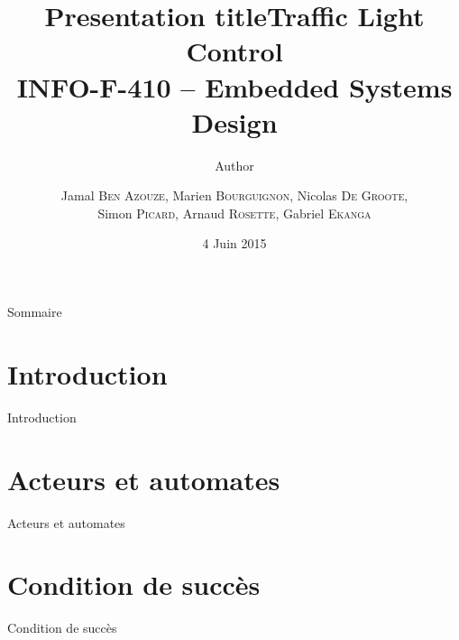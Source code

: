 \documentclass{beamer} %
\author{Author}
\title{Presentation title}
\begin{document}
\title[INFO-F-410 - Traffic Light Control]{\textbf{Traffic Light Control} \\INFO-F-410 -- Embedded Systems Design} %

\author{Jamal \textsc{Ben Azouze}, Marien \textsc{Bourguignon}, Nicolas \textsc{De Groote}, \\Simon \textsc{Picard}, Arnaud \textsc{Rosette}, Gabriel \textsc{Ekanga}}
\date{4 Juin 2015} %

\begin{frame}
\titlepage %
\end{frame}

\begin{frame}{Sommaire}
\tableofcontents %
\end{frame}

\section{Introduction}
\begin{frame}{Introduction}

\end{frame}

\section{Acteurs et automates}
\begin{frame}{Acteurs et automates}

\end{frame}

\section{Condition de succès}
\begin{frame}{Condition de succès}

\end{frame}
\end{document}
